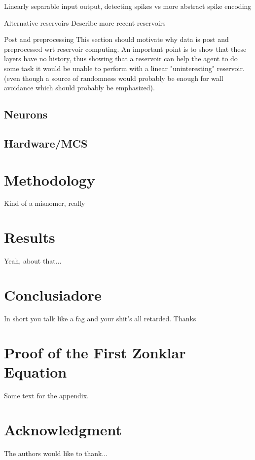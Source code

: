 \documentclass[journal]{IEEEtran}
\begin{document}
Linearly separable input output, detecting spikes vs more abstract spike encoding


Alternative reservoirs
Describe more recent reservoirs


Post and preprocessing
This section should motivate why data is post and preprocessed wrt reservoir computing.
An important point is to show that these layers have no history, thus showing that a 
reservoir can help the agent to do some task it would be unable to perform with a linear
"uninteresting" reservoir. (even though a source of randomness would probably be enough 
for wall avoidance which should probably be emphasized).
\subsection{Neurons}
\subsection{Hardware/MCS}

\section{Methodology}
Kind of a misnomer, really

\section{Results}
Yeah, about that...

\section{Conclusiadore}
In short you talk like a fag and your shit's all retarded. Thanks


\appendices
\section{Proof of the First Zonklar Equation}
Some text for the appendix.
\cite{li_application_2015}

\section*{Acknowledgment}


The authors would like to thank...


\ifCLASSOPTIONcaptionsoff
  \newpage
\fi


 

\end{document}
